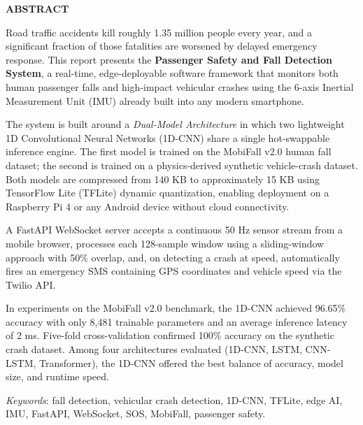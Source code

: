 \thispagestyle{plain}
\begin{center}
\textbf{\fontsize{16pt}{24pt}\selectfont ABSTRACT}
\end{center}

\vspace{0.3cm}

\fontsize{12pt}{18pt}\selectfont
Road traffic accidents kill roughly 1.35 million people every year, and a significant fraction of those fatalities are worsened by delayed emergency response. This report presents the \textbf{Passenger Safety and Fall Detection System}, a real-time, edge-deployable software framework that monitors both human passenger falls and high-impact vehicular crashes using the 6-axis Inertial Measurement Unit (IMU) already built into any modern smartphone.

The system is built around a \textit{Dual-Model Architecture} in which two lightweight 1D Convolutional Neural Networks (1D-CNN) share a single hot-swappable inference engine. The first model is trained on the MobiFall v2.0 human fall dataset; the second is trained on a physics-derived synthetic vehicle-crash dataset. Both models are compressed from 140 KB to approximately 15 KB using TensorFlow Lite (TFLite) dynamic quantization, enabling deployment on a Raspberry Pi 4 or any Android device without cloud connectivity.

A FastAPI WebSocket server accepts a continuous 50 Hz sensor stream from a mobile browser, processes each 128-sample window using a sliding-window approach with 50\% overlap, and, on detecting a crash at speed, automatically fires an emergency SMS containing GPS coordinates and vehicle speed via the Twilio API.

In experiments on the MobiFall v2.0 benchmark, the 1D-CNN achieved 96.65\% accuracy with only 8,481 trainable parameters and an average inference latency of 2 ms. Five-fold cross-validation confirmed 100\% accuracy on the synthetic crash dataset. Among four architectures evaluated (1D-CNN, LSTM, CNN-LSTM, Transformer), the 1D-CNN offered the best balance of accuracy, model size, and runtime speed.

\vspace{0.5cm}
\textit{Keywords}: fall detection, vehicular crash detection, 1D-CNN, TFLite, edge AI, IMU, FastAPI, WebSocket, SOS, MobiFall, passenger safety.

\newpage